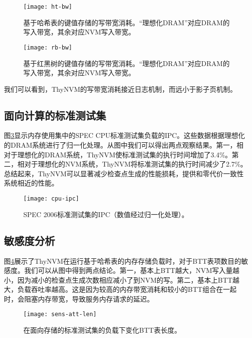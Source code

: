 \begin{figure}[!h]
\centering
\texttt{[image: ht-bw]}\\
\caption{基于哈希表的键值存储的写带宽消耗。``理想化DRAM''对应DRAM的写入带宽，其余对应NVM写入带宽。}
\label{fig:ht-bw}
\end{figure}

\begin{figure}[!h]
\centering
\texttt{[image: rb-bw]}\\
\caption{基于红黑树的键值存储的写带宽消耗。``理想化DRAM''对应DRAM的写入带宽，其余对应NVM写入带宽。}
\label{fig:rb-bw}
\end{figure}

我们可以看到，ThyNVM的写带宽消耗接近日志机制，而远小于影子页机制。

\subsection{面向计算的标准测试集}

图\ref{fig:cpu-ipc}显示内存使用集中的SPEC CPU标准测试集负载的IPC。这些数据根据理想化的DRAM系统进行了归一化处理。从图中我们可以得出两点观察结果。第一，相对于理想化的DRAM系统，ThyNVM使标准测试集的执行时间增加了3.4\%。第二，相对于理想化的NVM系统，ThyNVM将标准测试集的执行时间减少了2.7\%。总结起来，ThyNVM可以显著减少检查点生成的性能损耗，提供和零代价一致性系统相近的性能。
 
\begin{figure}[!h]
  \centering
  \texttt{[image: cpu-ipc]}
  \caption{SPEC 2006标准测试集的IPC（数值经过归一化处理）。}
  \label{fig:cpu-ipc}
\end{figure}
 
\subsection{敏感度分析}

图\ref{fig:sens-att-len}展示了ThyNVM在运行基于哈希表的内存存储负载时，对于BTT表项数目的敏感度。我们可以从图中得到两点结论。第一，基本上BTT越大，NVM写入量越小，因为减小的检查点生成次数相应减小了到NVM的写。第二，基本上BTT越大，负载吞吐率越高。这是因为较高的内存带宽消耗和较小的BTT组合在一起时，会阻塞内存带宽，导致服务内存请求的延迟。

\begin{figure}[!h]
  \centering
  \texttt{[image: sens-att-len]}
  \caption{在面向存储的标准测试集的负载下变化BTT表长度。}
  \label{fig:sens-att-len}
\end{figure}


